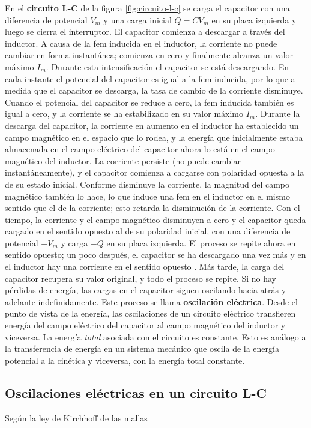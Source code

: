 En el \textbf{circuito L-C} de la figura \ref{fig:circuito-l-c} se carga el capacitor con una diferencia de potencial $V_m$ y una carga inicial $Q=CV_m$ en su placa izquierda y luego se cierra el interruptor. El capacitor comienza a descargar a través del inductor. A causa de la fem inducida en el inductor, la corriente no puede cambiar en forma instantánea; comienza en cero y finalmente alcanza un valor máximo $I_m$. Durante esta intensificación el capacitor se está descargando. En cada instante el potencial del capacitor es igual a la fem inducida, por lo que a medida que el capacitor se descarga, la tasa de cambio de la corriente disminuye. Cuando el potencial del capacitor se reduce a cero, la fem inducida también es igual a cero, y la corriente se ha estabilizado en su valor máximo $I_m$. Durante la descarga del capacitor, la corriente en aumento en el inductor ha establecido un campo magnético en el espacio que lo rodea, y la energía que inicialmente estaba almacenada en el campo eléctrico del capacitor ahora lo está en el campo magnético del inductor. La corriente persiste (no puede cambiar instantáneamente), y el capacitor comienza a cargarse con polaridad opuesta a la de su estado inicial. Conforme disminuye la corriente, la magnitud del campo magnético también lo hace, lo que induce una fem en el inductor en el mismo sentido que el de la corriente; esto retarda la disminución de la corriente. Con el tiempo, la corriente y el campo magnético disminuyen a cero y el capacitor queda cargado en el sentido opuesto al de su polaridad inicial, con una diferencia de potencial $-V_m$ y carga $-Q$ en su placa izquierda. El proceso se repite ahora en sentido opuesto; un poco después, el capacitor se ha descargado una vez más y en el inductor hay una corriente en el sentido opuesto . Más tarde, la carga del capacitor recupera su valor original, y todo el proceso se repite. Si no hay pérdidas de energía, las cargas en el capacitor siguen oscilando hacia atrás y adelante indefinidamente. Este proceso se llama \textbf{oscilación eléctrica}. Desde el punto de vista de la energía, las oscilaciones de un circuito eléctrico transfieren energía del campo eléctrico del capacitor al campo magnético del inductor y viceversa. La energía \textit{total} asociada con el circuito es constante. Esto es análogo a la transferencia de energía en un sistema mecánico que oscila de la energía potencial a la cinética y viceversa, con la energía total constante.

\subsection{Oscilaciones eléctricas en un circuito L-C}
Según la ley de Kirchhoff de las mallas

